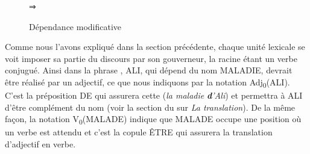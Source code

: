 \begin{figure}
\begin{minipage}[c]{.15\textwidth}\centering%
\end{minipage}
\begin{minipage}[c]{.1\textwidth}\centering⇒\end{minipage}
\begin{minipage}[c]{.15\textwidth}\centering%
\end{minipage}
\caption{Dépendance modificative}
\end{figure}

Comme nous l’avons expliqué dans la section précédente, chaque unité lexicale se voit imposer sa partie du discours par son gouverneur, la racine étant un verbe conjugué. Ainsi dans la phrase , ALI, qui dépend du nom MALADIE, devrait être réalisé par un adjectif, ce que nous indiquons par la notation Adj\textsubscript{0}(ALI). C’est la préposition DE qui assurera cette  (\textit{la maladie} \textbf{\textit{d}}\textit{’Ali}) et permettra à ALI d’être complément du nom (voir la section du  sur \textit{La translation}). De la même façon, la notation V\textsubscript{0}(MALADE) indique que MALADE occupe une position où un verbe est attendu et c’est la copule ÊTRE qui assurera la translation d’adjectif en verbe.

